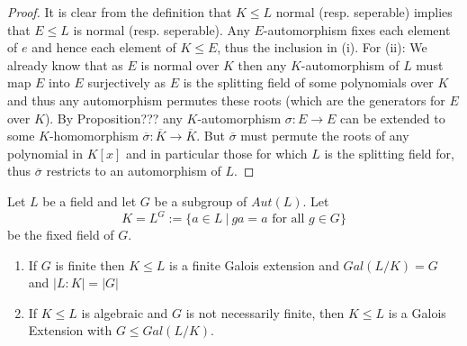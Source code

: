 \documentclass[twoside, a4paper, 10pt]{amsart}
\begin{document}
\begin{proof} It is clear from the definition that $K \leq L$ normal (resp. seperable) implies that $E \leq L$ is normal (resp. seperable). Any $E$-automorphism fixes each element of $e$ and hence each element of $K \leq E$, thus the inclusion in (i). For (ii): We already know that as $E$ is normal over $K$ then any $K$-automorphism of $L$ must map $E$ into $E$ surjectively as $E$ is the splitting field of some polynomials over $K$ and thus any automorphism permutes these roots (which are the generators for $E$ over $K$). By Proposition??? any $K$-automorphism $\sigma:E \to E$ can be extended to some $K$-homomorphism $\overline{\sigma}:\overline{K} \to \overline{K}$. But $\overline{\sigma}$ must permute the roots of any polynomial in $K[x]$ and in particular those for which $L$ is the splitting field for, thus $\overline{\sigma}$ restricts to an automorphism of $L$. \end{proof}

\begin{prop} Let $L$ be a field and let $G$ be a subgroup of $Aut(L)$. Let $$K=L^G:= \{a \in L ~|~ ga = a \text{ for all } g \in G\}$$ be the fixed field of $G$. 
\begin{enumerate}
	\item If $G$ is finite then $K \leq L$ is a finite Galois extension and $Gal(L/K) = G$ and $|L:K| = |G|$
	\item If $K \leq L$ is algebraic and $G$ is not necessarily finite, then $K \leq L$ is a Galois Extension with $G \leq Gal(L/K)$. 
\end{enumerate}

\end{prop}
\end{document}
